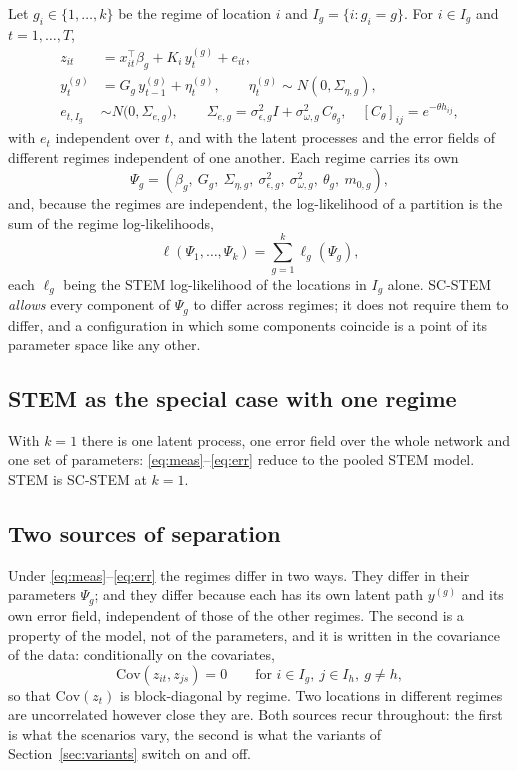 \documentclass[11pt]{article}
\newcommand{\Cov}{\mathrm{Cov}}
\begin{document}
Let $g_i \in \{1,\dots,k\}$ be the regime of location $i$ and $I_g = \{i : g_i = g\}$. For $i \in I_g$ and $t = 1,\dots,T$,
\begin{align}
  z_{it} &= x_{it}^\top \beta_g + K_i\, y^{(g)}_t + e_{it}, \label{eq:meas}\\
  y^{(g)}_t &= G_g\, y^{(g)}_{t-1} + \eta^{(g)}_t, \qquad \eta^{(g)}_t \sim N(0, \Sigma_{\eta,g}), \label{eq:state}\\
  e_{t,I_g} &\sim N\bigl(0, \Sigma_{e,g}\bigr), \qquad \Sigma_{e,g} = \sigma^2_{\epsilon,g} I + \sigma^2_{\omega,g}\, C_{\theta_g}, \quad [C_{\theta}]_{ij} = e^{-\theta h_{ij}}, \label{eq:err}
\end{align}
with $e_t$ independent over $t$, and with the latent processes and the error fields of different regimes independent of one another. Each regime carries its own
\[
  \Psi_g = (\beta_g,\ G_g,\ \Sigma_{\eta,g},\ \sigma^2_{\epsilon,g},\ \sigma^2_{\omega,g},\ \theta_g,\ m_{0,g}),
\]
and, because the regimes are independent, the log-likelihood of a partition is the sum of the regime log-likelihoods,
\begin{equation}\label{eq:loglik}
  \ell(\Psi_1,\dots,\Psi_k) = \sum_{g=1}^k \ell_g(\Psi_g),
\end{equation}
each $\ell_g$ being the STEM log-likelihood of the locations in $I_g$ alone. SC-STEM \emph{allows} every component of $\Psi_g$ to differ across regimes; it does not require them to differ, and a configuration in which some components coincide is a point of its parameter space like any other.

\subsection{STEM as the special case with one regime}

With $k = 1$ there is one latent process, one error field over the whole network and one set of parameters: \eqref{eq:meas}--\eqref{eq:err} reduce to the pooled STEM model. STEM is SC-STEM at $k = 1$.

\subsection{Two sources of separation}

Under \eqref{eq:meas}--\eqref{eq:err} the regimes differ in two ways. They differ in their parameters $\Psi_g$; and they differ because each has its own latent path $y^{(g)}$ and its own error field, independent of those of the other regimes. The second is a property of the model, not of the parameters, and it is written in the covariance of the data: conditionally on the covariates,
\begin{equation}\label{eq:blockcov}
  \Cov(z_{it}, z_{js}) = 0 \qquad \text{for } i \in I_g,\ j \in I_h,\ g \neq h,
\end{equation}
so that $\Cov(z_t)$ is block-diagonal by regime. Two locations in different regimes are uncorrelated however close they are. Both sources recur throughout: the first is what the scenarios vary, the second is what the variants of Section~\ref{sec:variants} switch on and off.
\end{document}
